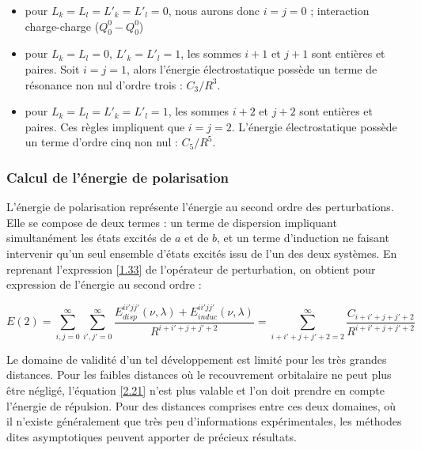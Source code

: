 	\begin{itemize}
		\item pour $L_{k}=L_{l}=L'_{k}=L'_{l} = 0$, nous aurons donc $i=j=0$ ; interaction charge-charge ($Q_{0}^{0}- Q_{0}^{0}$)	
		\item pour $L_{k}=L_{l}=0$, $L'_{k}=L'_{l}=1$, les sommes $i+1$ et $j+1$ sont entières et paires. Soit $i=j=1$, alors l'énergie électrostatique possède un terme de résonance non nul d'ordre trois : $C_{3}/R^{3}$.
		\item pour $L_{k}=L_{l}=L'_{k}=L'_{l}=1$, les sommes $i+2$ et $j+2$ sont entières et paires. Ces règles impliquent que $i=j=2$. L'énergie électrostatique possède un terme d'ordre cinq non nul : $C_{5}/R^{5}$.
	\end{itemize}
	
	
	\subsubsection{Calcul de l’énergie de polarisation}
	
	L'énergie de polarisation représente l'énergie au second ordre des perturbations. Elle se compose de deux termes : un terme de dispersion impliquant simultanément les états excités de $a$ et de $b$, et un terme d'induction ne faisant intervenir qu'un seul ensemble d'états excités issu de l'un des deux systèmes. En reprenant l'expression \ref{1.33} de l'opérateur de perturbation, on obtient pour expression de l'énergie au second ordre : 
	
	\begin{equation}
	E(2) = \sum_{i,j=0}^{\infty} \sum_{i',j'=0}^{\infty} \frac{E_{disp}^{ii'jj'} (\nu , \lambda) + E_{induc}^{ii'jj'}(\nu , \lambda)}{R^{i+i'+j+j'+2}} = \sum_{i+i'+j+j'+2=2}^{\infty} \frac{C_{i+i'+j+j'+2}}{R^{i+i'+j+j'+2}} \label{2.21}
	\end{equation}
	
	Le domaine de validité d'un tel développement est limité pour les très grandes distances. Pour les faibles distances où le recouvrement orbitalaire ne peut plus être négligé, l'équation \ref{2.21} n'est plus valable et l'on doit prendre en compte l'énergie de répulsion. Pour des distances comprises entre ces deux domaines, où il n'existe généralement que très peu d'informations expérimentales, les méthodes dites asymptotiques peuvent apporter de précieux résultats.
	
